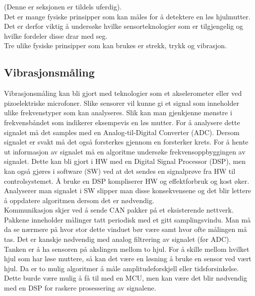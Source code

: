 (Denne er seksjonen er tildels uferdig). \\

Det er mange fysiske prinsipper som kan måles for å detektere en løs hjulmutter.
Det er derfor viktig å undersøke hvilke sensorteknologier som er tilgjengelig og
hvilke fordeler disse drar med seg. \\

Tre ulike fysiske prinsipper som kan brukes er strekk, trykk og vibrasjon. \\

\subsection{Vibrasjonsmåling}

Vibrasjonsmåling kan bli gjort med teknologier som et akselerometer eller ved
pizoelektriske microfoner. Slike sensorer vil kunne gi et signal som inneholder
ulike frekvenstyper som kan analyseres. Slik kan man gjenkjenne mønstre i 
frekvensbåndet som indikerer eksempevis en løs mutter. For å analysere dette signalet må det
samples med en Analog-til-Digital Converter (ADC). Dersom signalet er svakt må det også forsterkes gjennom en
forsterker krets. For å hente ut informasjon av signalet må en algoritme undersøke
frekvensoppbyggingen av signalet. Dette kan bli gjort i HW med en Digital Signal Processor (DSP), men kan
også gjøres i software (SW) ved at det sendes en signalprøve fra HW til controlsystemet. Å
bruke en DSP kompliserer HW og effektforbruk og kost øker. Analyserer man
signalet i SW slipper man disse konsekvensene og det blir lettere å oppdatere
algoritmen dersom det er nødvendig. \\

Kommunikasjon skjer ved å sende CAN pakker på et eksisterende nettverk. Pakkene
inneholder målinger tatt periodisk med et gitt samplingsvindu. Man må da se
nærmere på hvor stor dette vinduet bør være samt hvor ofte målingen må tas. Det
er kanskje nødvendig med analog filtrering av signalet (før ADC). \\

Tanken er å ha sensoren på akslingen mellom to hjul. For å skille mellom hvilket
hjul som har løse muttere, så kan det være en løsning å bruke en sensor ved vært
hjul. Da er to mulig algoritmer å måle amplitudeforskjell eller
tidsforsinkelse. Dette burde være mulig å få til med en MCU, men kan være det
blir nødvendig med en DSP for raskere prosessering av signalene. \\

